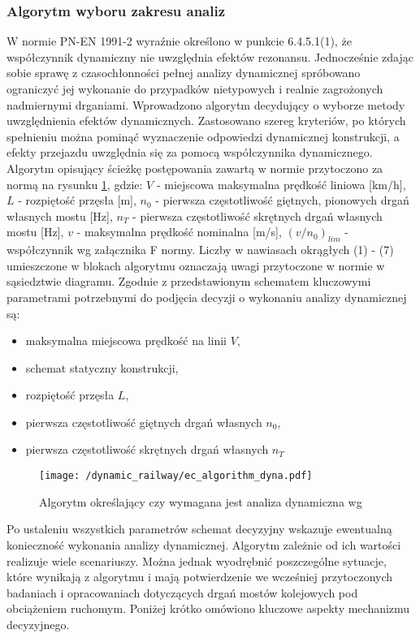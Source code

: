 \subsubsection{Algorytm wyboru zakresu analiz}
W normie PN-EN 1991-2 wyraźnie określono w punkcie 6.4.5.1(1), że współczynnik dynamiczny nie uwzględnia efektów rezonansu. Jednocześnie zdając sobie sprawę z czasochłonności pełnej analizy dynamicznej spróbowano ograniczyć jej wykonanie do przypadków nietypowych i realnie zagrożonych nadmiernymi drganiami. Wprowadzono algorytm decydujący o wyborze metody uwzględnienia efektów dynamicznych. Zastosowano szereg kryteriów, po których spełnieniu można pominąć wyznaczenie odpowiedzi dynamicznej konstrukcji, a efekty przejazdu uwzględnia się za pomocą współczynnika dynamicznego. Algorytm opisujący ścieżkę postępowania zawartą w normie przytoczono za normą \parencite{PKNj} na rysunku \ref{fig:ec_algorithm_dyna}, gdzie: $V$ - miejscowa maksymalna prędkość liniowa [km/h], $L$ - rozpiętość przęsła [m], $n_0$ - pierwsza częstotliwość giętnych, pionowych drgań własnych mostu [Hz], $n_T$ - pierwsza częstotliwość skrętnych drgań własnych mostu [Hz], $v$ - maksymalna prędkość nominalna [m/s], $(v/n_0)_{lim}$ - współczynnik wg załącznika F normy. Liczby w nawiasach okrągłych (1) - (7) umieszczone w blokach algorytmu oznaczają uwagi przytoczone w normie w sąsiedztwie diagramu. Zgodnie z przedstawionym schematem kluczowymi parametrami potrzebnymi do podjęcia decyzji o wykonaniu analizy dynamicznej są:
\begin{itemize}
	\item maksymalna miejscowa prędkość na linii $V$,
	\item schemat statyczny konstrukcji,
	\item rozpiętość przęsła $L$, 
	\item pierwsza częstotliwość giętnych drgań własnych $n_0$,
	\item pierwsza częstotliwość skrętnych drgań własnych $n_T$
\end{itemize}
\begin{figure}[p]
	\centering
	\texttt{[image: /dynamic\_railway/ec\_algorithm\_dyna.pdf]}
	\captionsetup{justification=centering}
	\caption{Algorytm określający czy wymagana jest analiza dynamiczna wg \parencite{PKNj}}
	\label{fig:ec_algorithm_dyna}
\end{figure}

Po ustaleniu wszystkich parametrów schemat decyzyjny wskazuje ewentualną konieczność wykonania analizy dynamicznej. Algorytm zależnie od ich wartości realizuje wiele scenariuszy. Można jednak wyodrębnić poszczególne sytuacje, które wynikają z algorytmu i mają potwierdzenie we wcześniej przytoczonych badaniach i opracowaniach dotyczących drgań mostów kolejowych pod obciążeniem ruchomym. Poniżej krótko omówiono kluczowe aspekty mechanizmu decyzyjnego. 

